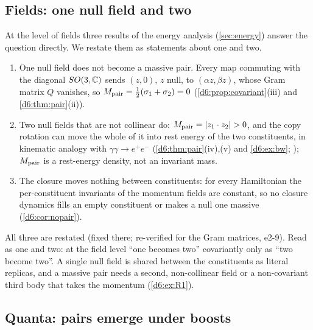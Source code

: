 \subsection{Fields: one null field and two}
\label{e2:sec:field}

At the level of fields three results of the energy analysis (\cref{sec:energy}) answer the question directly. We restate them as statements about one and two.

\begin{corollary}
\label{e2:cor:field}
\begin{enumerate}[label=(\roman*),leftmargin=2.2em]
\item One null field does not become a massive pair. Every map commuting with the diagonal $SO(3,\mathbb{C})$ sends $(z,0)$, $z$ null, to
$(\alpha z,\beta z)$, whose Gram matrix $Q$ vanishes, so $M_{\rm pair}=\tfrac12(\sigma_1+\sigma_2)=0$ (\cref{d6:prop:covariant}(iii) and \cref{d6:thm:pair}(ii)).
\item Two null fields that are not collinear do: $M_{\rm pair}=|z_1\cdot z_2|>0$, and the copy rotation can move the whole of it into rest
energy of the two constituents, in kinematic analogy with $\gamma\gamma\to e^+e^-$ (\cref{d6:thm:pair}(iv),(v) and \cref{d6:ex:bw}; \cite{BreitWheeler34});
$M_{\rm pair}$ is a rest-energy density, not an invariant mass.
\item The closure moves nothing between constituents: for every Hamiltonian the per-constituent invariants of the momentum fields are
constant, so no closure dynamics fills an empty constituent or makes a null one massive (\cref{d6:cor:nopair}).
\end{enumerate}
\end{corollary}

All three are restated (fixed there; re-verified for the Gram matrices, e2-9). Read as one and two: at the field level ``one becomes two''
covariantly only as ``two become two''. A single null field is shared between the constituents as literal replicas, and a massive pair
needs a second, non-collinear field or a non-covariant third body that takes the momentum (\cref{d6:ex:R1}).

\subsection{Quanta: pairs emerge under boosts}
\label{e2:sec:quanta}

